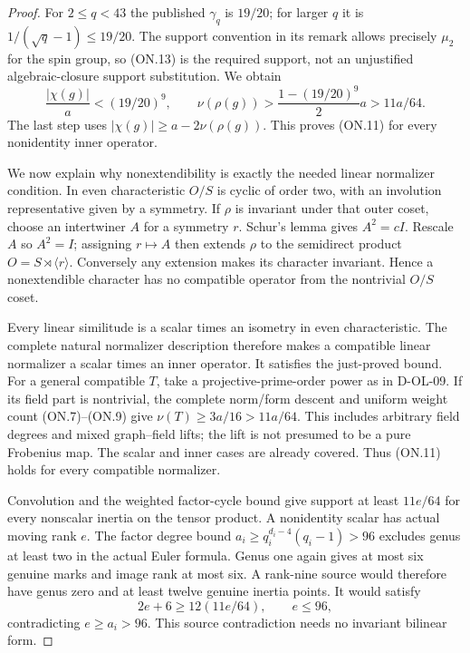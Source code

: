 \begin{proof}
For $2\le q<43$ the published $\gamma_q$ is $19/20$; for larger
$q$ it is $1/(\sqrt q-1)\le19/20$.
The support convention in its remark allows precisely $\mu_2$
for the spin group, so (ON.13) is the required support, not an
unjustified algebraic-closure support substitution.  We obtain
\[
 \frac{|\chi(g)|}{a}<(19/20)^9,\qquad
 \nu(\rho(g))>
 \frac{1-(19/20)^9}{2}a>11a/64.                              \tag{ON.14}
\]
The last step uses $|\chi(g)|\ge a-2\nu(\rho(g))$.
This proves (ON.11) for every nonidentity inner operator.

We now explain why nonextendibility is exactly the needed linear
normalizer condition.  In even characteristic $O/S$ is cyclic of
order two, with an involution representative given by a symmetry.
If $\rho$ is invariant under that outer coset, choose an intertwiner
$A$ for a symmetry $r$.  Schur's lemma gives $A^2=cI$.
Rescale $A$ so $A^2=I$; assigning $r\mapsto A$ then extends
$\rho$ to the semidirect product $O=S\rtimes\langle r\rangle$.
Conversely any extension makes its character invariant.  Hence a
nonextendible character has no compatible operator from the
nontrivial $O/S$ coset.

Every linear similitude is a scalar times an isometry in even
characteristic.  The complete natural normalizer description
therefore makes a compatible linear normalizer a scalar times
an inner operator.  It satisfies the just-proved bound.
For a general compatible $T$, take a projective-prime-order power
as in D-OL-09.  If its field part is nontrivial, the complete
norm/form descent and uniform weight count (ON.7)--(ON.9) give
$\nu(T)\ge3a/16>11a/64$.  This includes arbitrary field degrees
and mixed graph--field lifts; the lift is not presumed to be a
pure Frobenius map.  The scalar and inner cases are already
covered.  Thus (ON.11) holds for every compatible normalizer.

Convolution and the weighted factor-cycle bound give support at
least $11e/64$ for every nonscalar inertia on the tensor product.
A nonidentity scalar has actual moving rank $e$.  The factor
degree bound $a_i\ge q_i^{d_i-4}(q_i-1)>96$ excludes genus at
least two in the actual Euler formula.  Genus one again gives
at most six genuine marks and image rank at most six.
A rank-nine source would therefore have genus zero and at least
twelve genuine inertia points.  It would satisfy
\[
                         2e+6\ge12(11e/64),\qquad e\le96,
                                                               \tag{ON.15}
\]
contradicting $e\ge a_i>96$.  This source contradiction needs
no invariant bilinear form.
\end{proof}

